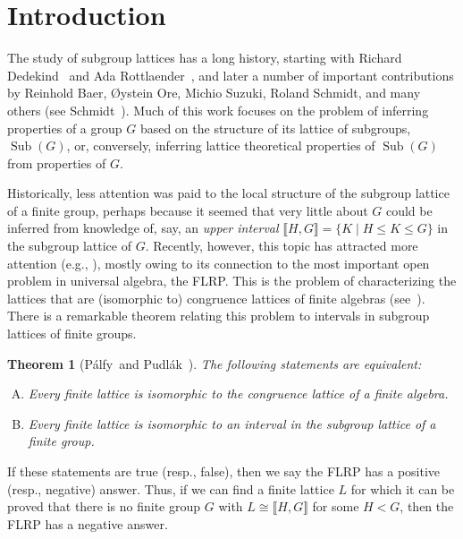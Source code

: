 \documentclass{gen-j-l}
\newcommand{\lb}{\ensuremath{\llbracket}}
\newcommand{\rb}{\ensuremath{\rrbracket}}
\newcommand{\<}{\ensuremath{\langle}}
\renewcommand{\>}{\ensuremath{\rangle}}
\theoremstyle{plain}
\newtheorem{theorem}{Theorem}[section]
\theoremstyle{definition}
\theoremstyle{remark}
\numberwithin{theorem}{section}
\numberwithin{claim}{section}
\numberwithin{equation}{section}
\numberwithin{conjecture}{section}
\newcommand{\Palfy}{P\'alfy}
\newcommand{\Pudlak}{Pudl\'ak}
\renewcommand{\leq}{\ensuremath{\leqslant}}
\newcommand{\Sub}{\ensuremath{\operatorname{Sub}}}
\newcommand{\2}{\ensuremath{\mathbf{2}}}
\newcommand{\3}{\ensuremath{\mathbf{3}}}
\begin{document}


\section{Introduction}
\label{sec:intro}
The study of subgroup lattices has a long history, starting with 
Richard Dedekind~\cite{Dedekind:1877} 
and 
Ada Rottlaender~\cite{Rottlaender:1928}, and
later a number of important contributions by Reinhold Baer, 
{\O}ystein Ore, 
Michio Suzuki, 
Roland Schmidt, 
and many others (see Schmidt~\cite{Schmidt:1994}).
Much of this work focuses on the problem of inferring
properties of a group $G$ based on the structure of its lattice of subgroups,
$\Sub(G)$,  or, conversely,  inferring lattice theoretical properties of $\Sub(G)$ from properties of
$G$. 

Historically, less attention was paid to the local structure of the
subgroup lattice of a finite group, perhaps because it seemed that very little
about $G$ could be inferred from knowledge of, say, an \emph{upper
  interval} $\lb H,G \rb = \{K \mid H\leq K \leq G\}$ in the subgroup lattice of $G$.
Recently, however, this topic has attracted more attention (e.g.,
\cite{Aschbacher:2009,Lucchini:1997,Basile:2001,Borner:1999,Kohler:1983,Lucchini:1994a,Palfy:1988,Palfy:1995}),
mostly owing to its connection to the most important open problem in
universal algebra,
the \ac{FLRP}. This is the problem of
characterizing the lattices that are (isomorphic to) congruence lattices of
finite algebras (see~\cite{Berman:1970,DeMeo:thesis,Palfy:1995,Palfy:2001}). 
There is a remarkable theorem relating this problem to intervals in subgroup
lattices of finite groups. 
\begin{theorem}[\Palfy\ and \Pudlak~\cite{Palfy:1980}]
\label{thm:P5}
The following statements are equivalent:
\begin{enumerate}[(A)]
\item Every finite lattice is isomorphic to
  the congruence lattice of a finite algebra.
\item Every finite lattice is isomorphic to
  an interval in the subgroup lattice of a finite group.
\end{enumerate}
\end{theorem}
If these statements are true (resp., false), then we say the \acs{FLRP} has
a positive (resp., negative) answer. 
Thus, if we can find a finite lattice $L$ for which it can be proved that there
is no finite group $G$ with $L \cong \lb H,G \rb$ for some $H< G$, then the
\acs{FLRP} has a negative answer.  
\end{document}
